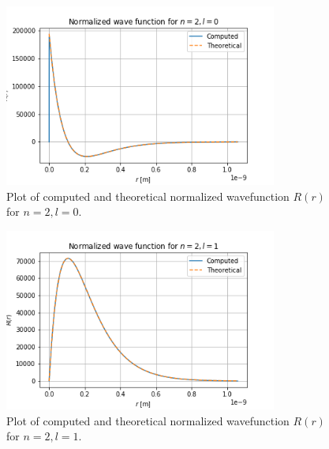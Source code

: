 \documentclass{article}
\begin{document}
\begin{figure}[H]
	\centering
	\includegraphics[width=0.8\textwidth]{../images/q2_d_n=2_l=0.png}
	\caption{Plot of computed and theoretical normalized wavefunction $R(r)$ for $n=2, l=0$.}
	\label{fig:q2_d_n=2_l=0}
\end{figure}

\begin{figure}[H]
	\centering
	\includegraphics[width=0.8\textwidth]{../images/q2_d_n=2_l=1.png}
	\caption{Plot of computed and theoretical normalized wavefunction $R(r)$ for $n=2, l=1$.}
	\label{fig:q2_d_n=2_l=1}
\end{figure}
\end{document}
